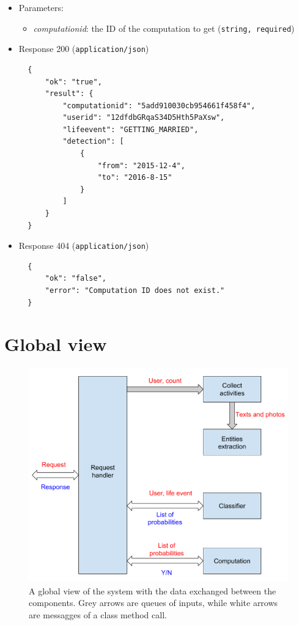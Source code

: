\begin{itemize}
\item
  Parameters:

  \begin{itemize}
  \item
    \textit{computationid}: the ID of the computation to get (\texttt{string, required})
  \end{itemize}
\item
  Response 200 (\texttt{application/json})

\begin{verbatim}
  {
      "ok": "true",
      "result": {
          "computationid": "5add910030cb954661f458f4",
          "userid": "12dfdbGRqaS34D5Hth5PaXsw",
          "lifeevent": "GETTING_MARRIED",
          "detection": [
              {
                  "from": "2015-12-4",
                  "to": "2016-8-15"
              }
          ]
      }
  }
\end{verbatim}

\item
  Response 404 (\texttt{application/json})

\begin{verbatim}
  {
      "ok": "false",
      "error": "Computation ID does not exist."
  }
\end{verbatim}
\end{itemize}

\section{Global view}

\begin{figure}
\centering
\includegraphics[width=%
1.0\textwidth]{img/Globalview}
\caption{A global view of the system with the data exchanged between the components. Grey arrows are queues of inputs, while white arrows are messagges of a class method call.}
\label{fig:globalview}
\end{figure}

